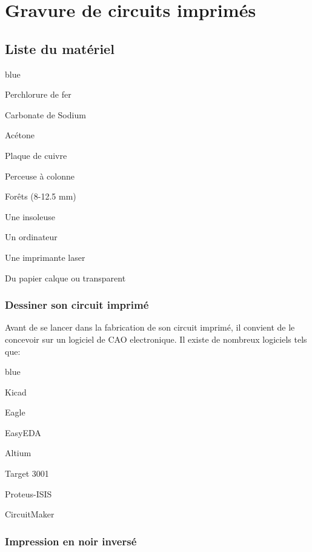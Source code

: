 {%

\chapter{Gravure de circuits imprimés}

\section{Liste du matériel}

\begin{items}{blue}{\Bullet}
	\item Perchlorure de fer
	\item Carbonate de Sodium
	\item Acétone
	\item Plaque de cuivre 
	\item Perceuse à colonne
	\item Forêts (8-12.5 mm)
	\item Une insoleuse
	\item Un ordinateur
	\item Une imprimante laser
	\item Du papier calque ou transparent
\end{items}

\subsection{Dessiner son circuit imprimé}

Avant de se lancer dans la fabrication de son circuit imprimé, il convient de le concevoir sur un logiciel de CAO electronique.
Il existe de nombreux logiciels tels que:

\begin{items}{blue}{\Bullet}
	\item Kicad
	\item Eagle
	\item EasyEDA
	\item Altium 
	\item Target 3001
	\item Proteus-ISIS
	\item CircuitMaker
\end{items}

\subsection{Impression en noir inversé}

}
